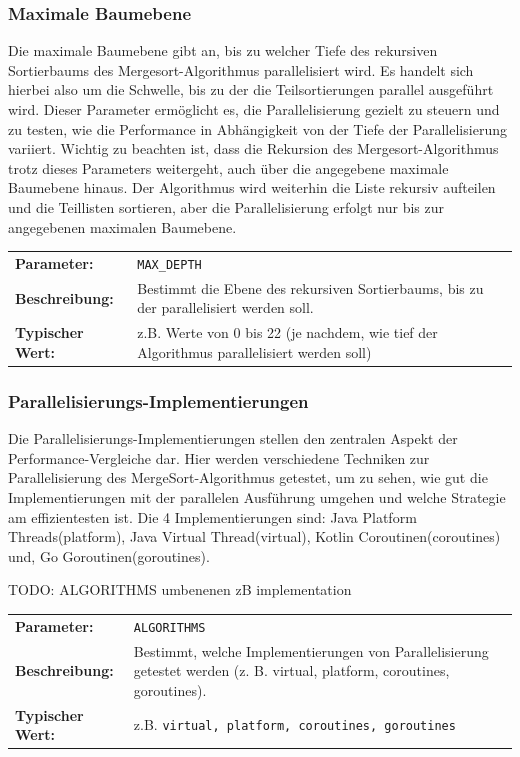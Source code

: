 \documentclass[fontsize=12pt,paper=a4,twoside=semi,parskip=half-,headsepline,headinclude]{scrreprt}
\begin{document}
\subsubsection{Maximale Baumebene}

Die maximale Baumebene gibt an, bis zu welcher Tiefe des rekursiven Sortierbaums des 
Mergesort-Algorithmus parallelisiert wird. Es handelt sich hierbei also um die Schwelle, bis zu der die Teilsortierungen parallel ausgeführt wird. Dieser Parameter ermöglicht es, die Parallelisierung gezielt zu steuern und zu testen, wie die Performance in Abhängigkeit von der Tiefe der Parallelisierung variiert. Wichtig zu beachten ist, dass die Rekursion des Mergesort-Algorithmus trotz dieses Parameters weitergeht, auch über die angegebene maximale Baumebene hinaus. Der Algorithmus wird weiterhin die Liste rekursiv aufteilen und die Teillisten sortieren, aber die Parallelisierung erfolgt nur bis zur angegebenen maximalen Baumebene.

\begin{tabularx}{\textwidth}{@{}lX@{}}
	\textbf{Parameter:}    & \texttt{MAX\_DEPTH} \\
	\textbf{Beschreibung:} & Bestimmt die Ebene des rekursiven Sortierbaums, 
	bis zu der parallelisiert werden soll. \\
	\textbf{Typischer Wert:} & z.B. Werte von 0 bis 22 (je nachdem, wie tief der Algorithmus parallelisiert werden soll)
\end{tabularx}

\subsubsection{Parallelisierungs-Implementierungen}

Die Parallelisierungs-Implementierungen stellen den zentralen Aspekt der Performance-Vergleiche dar. Hier werden verschiedene Techniken zur Parallelisierung des MergeSort-Algorithmus getestet, um zu sehen, wie gut die Implementierungen mit der parallelen Ausführung umgehen und welche Strategie am effizientesten ist. Die 4 Implementierungen sind: Java Platform Threads(platform), Java Virtual Thread(virtual), Kotlin Coroutinen(coroutines) und, Go Goroutinen(goroutines).

TODO: ALGORITHMS umbenenen zB implementation

\begin{tabularx}{\textwidth}{@{}lX@{}}
	\textbf{Parameter:}    & \texttt{ALGORITHMS} \\
	\textbf{Beschreibung:} & Bestimmt, welche Implementierungen von Parallelisierung getestet werden (z. B. virtual, platform, coroutines, goroutines). \\
	\textbf{Typischer Wert:} & z.B. \texttt{virtual, platform, coroutines, goroutines}
\end{tabularx}
\end{document}
